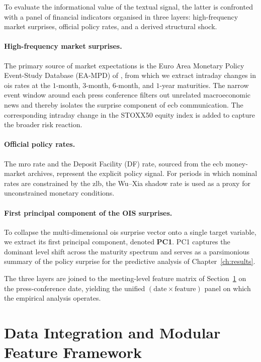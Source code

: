 To evaluate the informational value of the textual signal, the latter is confronted with a panel of financial indicators organised in three layers: high-frequency market surprises, official policy rates, and a derived structural shock.

\paragraph{High-frequency market surprises.} The primary source of market expectations is the Euro Area Monetary Policy Event-Study Database (EA-MPD) of \cite{altavilla2019measuring}, from which we extract intraday changes in \gls{ois} rates at the $1$-month, $3$-month, $6$-month, and $1$-year maturities. The narrow event window around each press conference filters out unrelated macroeconomic news and thereby isolates the surprise component of \gls{ecb} communication. The corresponding intraday change in the STOXX50 equity index is added to capture the broader risk reaction.

\paragraph{Official policy rates.} The \gls{mro} rate and the Deposit Facility (DF) rate, sourced from the
\gls{ecb} money-market archives, represent the explicit policy signal. For periods in which nominal rates are constrained by the \gls{zlb}, the Wu--Xia shadow rate \cite{wu2016measuring} is used as a proxy for unconstrained monetary conditions.

\paragraph{First principal component of the OIS surprises.} To collapse the mul\-ti-di\-men\-sional \gls{ois} surprise vector onto a single target variable, we extract its first principal component, denoted \textbf{PC1}. PC1 captures the dominant level shift across the maturity spectrum and serves as a parsimonious summary of the policy surprise for the predictive analysis of Chapter~\ref{ch:results}.

The three layers are joined to the meeting-level feature matrix of Section~\ref{sec:feature_construction} on the press-conference date, yielding the unified $(\text{date} \times \text{feature})$ panel on which the empirical analysis operates.

\section{Data Integration and Modular Feature Framework}
\label{sec:feature_construction}


